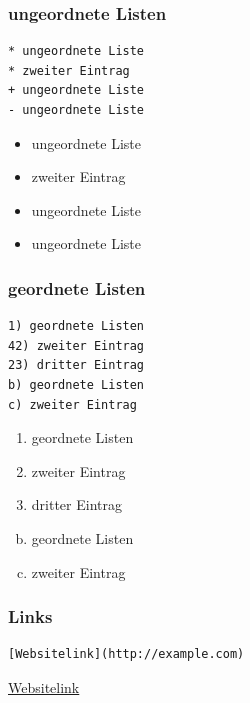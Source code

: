 \begin{frame}[fragile]\frametitle{ungeordnete Listen}

\begin{verbatim}
* ungeordnete Liste
* zweiter Eintrag
+ ungeordnete Liste
- ungeordnete Liste
\end{verbatim}

\begin{itemize}
\item
  ungeordnete Liste
\item
  zweiter Eintrag
\item
  ungeordnete Liste
\item
  ungeordnete Liste
\end{itemize}

\end{frame}

\begin{frame}[fragile]\frametitle{geordnete Listen}

\begin{verbatim}
1) geordnete Listen
42) zweiter Eintrag
23) dritter Eintrag
b) geordnete Listen
c) zweiter Eintrag
\end{verbatim}

\begin{enumerate}[1)]
\item
  geordnete Listen
\item
  zweiter Eintrag
\item
  dritter Eintrag
\end{enumerate}

\begin{enumerate}[a)]
\setcounter{enumi}{1}
\item
  geordnete Listen
\item
  zweiter Eintrag
\end{enumerate}

\end{frame}

\begin{frame}[fragile]\frametitle{Links}

\begin{verbatim}
[Websitelink](http://example.com)
\end{verbatim}

\href{http://example.com}{Websitelink}

\end{frame}

